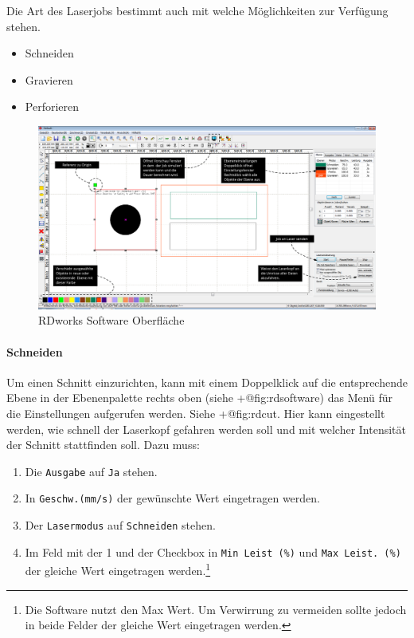 \documentclass[]{article}
\providecommand{\tightlist}{%
  \setlength{\itemsep}{0pt}\setlength{\parskip}{0pt}}
\let\oldparagraph\paragraph
\renewcommand{\paragraph}[1]{\oldparagraph{#1}\mbox{}}
\begin{document}
Die Art des Laserjobs bestimmt auch mit welche Möglichkeiten zur
Verfügung stehen.

\begin{itemize}
\tightlist
\item
  Schneiden
\item
  Gravieren
\item
  Perforieren
\end{itemize}

\begin{figure}
\hypertarget{fig:rdsoftware}{%
\centering
\includegraphics{assets/images/rdworks-software.PNG}
\caption{RDworks Software Oberfläche}\label{fig:rdsoftware}
}
\end{figure}

\newpage

\hypertarget{schneiden}{%
\paragraph{Schneiden}\label{schneiden}}

Um einen Schnitt einzurichten, kann mit einem Doppelklick auf die
entsprechende Ebene in der Ebenenpalette rechts oben (siehe
+@fig:rdsoftware) das Menü für die Einstellungen aufgerufen werden.
Siehe +@fig:rdcut. Hier kann eingestellt werden, wie schnell der
Laserkopf gefahren werden soll und mit welcher Intensität der Schnitt
stattfinden soll. Dazu muss:

\begin{enumerate}
\def\labelenumi{\arabic{enumi}.}
\tightlist
\item
  Die \texttt{Ausgabe} auf \texttt{Ja} stehen.
\item
  In \texttt{Geschw.(mm/s)} der gewünschte Wert eingetragen werden.
\item
  Der \texttt{Lasermodus} auf \texttt{Schneiden} stehen.
\item
  Im Feld mit der 1 und der Checkbox in \texttt{Min\ Leist\ (\%)} und
  \texttt{Max\ Leist.\ (\%)} der gleiche Wert eingetragen
  werden.\footnote{Die Software nutzt den Max Wert. Um Verwirrung zu
    vermeiden sollte jedoch in beide Felder der gleiche Wert eingetragen
    werden.}
\end{enumerate}
\end{document}
